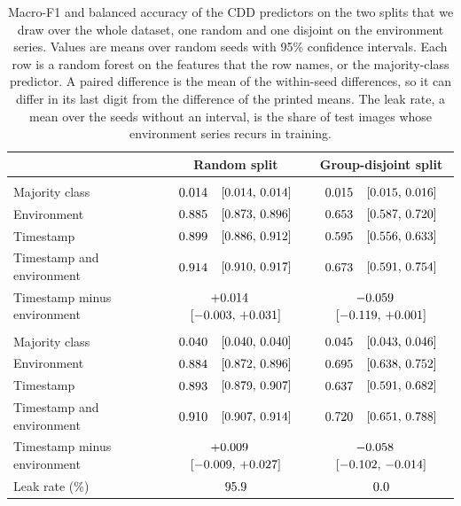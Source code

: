 \documentclass[preprint,12pt,authoryear,nopreprintline]{elsarticle}
\begin{document}
\begin{table}[t]
\centering
\footnotesize
\caption{Macro-F1 and balanced accuracy of the CDD predictors on the two splits
that we draw over the whole dataset, one random and one disjoint on the environment
series. Values are means over \cddSeeds{} random seeds with 95\% confidence
intervals. Each row is a random forest on the features that the row names, or the
majority-class predictor. A paired difference is the mean of the within-seed
differences, so it can differ in its last digit from the difference of the printed
means. The leak rate, a mean over the seeds without an interval, is the share of test
images whose environment series recurs in training.}
\label{tab:cdd}
\begin{tabular}{>{\raggedright\arraybackslash}p{}cc}
\toprule
 & Random split & Group-disjoint split \\
\midrule
\multicolumn{3}{l}{\emph{Macro-F1}} \\
Majority class & $0.014{}$~~$[0.014,\,0.014]{}$ & $0.015{}$~~$[0.015,\,0.016]{}$ \\
Environment & $0.885{}$~~$[0.873,\,0.896]{}$ & $0.653{}$~~$[0.587,\,0.720]{}$ \\
Timestamp & $0.899{}$~~$[0.886,\,0.912]{}$ & $0.595{}$~~$[0.556,\,0.633]{}$ \\
Timestamp and environment & $0.914{}$~~$[0.910,\,0.917]{}$ & $0.673{}$~~$[0.591,\,0.754]{}$ \\
\midrule
Timestamp minus environment & $+0.014{}$~~$[-0.003,\,+0.031]{}$ & $-0.059{}$~~$[-0.119,\,+0.001]{}$ \\
\midrule
\multicolumn{3}{l}{\emph{Balanced accuracy}} \\
Majority class & $0.040{}$~~$[0.040,\,0.040]{}$ & $0.045{}$~~$[0.043,\,0.046]{}$ \\
Environment & $0.884{}$~~$[0.872,\,0.896]{}$ & $0.695{}$~~$[0.638,\,0.752]{}$ \\
Timestamp & $0.893{}$~~$[0.879,\,0.907]{}$ & $0.637{}$~~$[0.591,\,0.682]{}$ \\
Timestamp and environment & $0.910{}$~~$[0.907,\,0.914]{}$ & $0.720{}$~~$[0.651,\,0.788]{}$ \\
Timestamp minus environment & $+0.009{}$~~$[-0.009,\,+0.027]{}$ & $-0.058{}$~~$[-0.102,\,-0.014]{}$ \\
\midrule
Leak rate (\%) & $95.9{}$ & $0.0{}$ \\
\bottomrule
\end{tabular}
\end{table}
\end{document}

